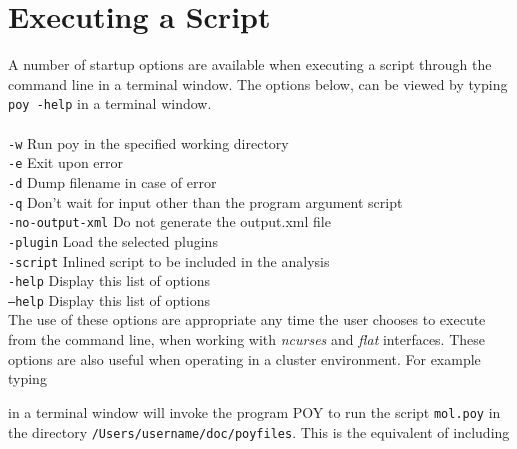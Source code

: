 \section {Executing a Script}
\label {sec: ExecutingScript}
A number of startup options are available when executing a script through the command line in a 
terminal window. The options below, can be viewed by typing \texttt{poy -help} in a terminal window.\\
\\
  \texttt{-w} \hspace{0.25 cm} Run poy in the specified working directory\\
  \texttt{-e}  \hspace{0.25 cm} Exit upon error\\
  \texttt{-d}  \hspace{0.25 cm} Dump filename in case of error\\
  \texttt{-q}  \hspace{0.25 cm} Don't wait for input other than the program argument script\\
  \texttt{-no-output-xml}  \hspace{0.25 cm} Do not generate the output.xml file\\
  \texttt{-plugin}  \hspace{0.25 cm} Load the selected plugins\\
  \texttt{-script}  \hspace{0.25 cm} Inlined script to be included in the analysis\\
  \texttt{-help}  \hspace{0.25 cm} Display this list of options\\
  \texttt{--help}  \hspace{0.25 cm} Display this list of options\\
  
The use of these options are appropriate any time the user chooses to execute \poy from the command line,  when 
working with \emph{ncurses} and \emph{flat} interfaces. These options are also useful when operating \poy in a cluster environment. 
For example typing

\begin{quote}
\end{quote}
in a terminal window will invoke the program POY to run the script \texttt{mol.poy} in the directory 
\texttt{/Users/username/doc/poyfiles}.  This is the equivalent of including


